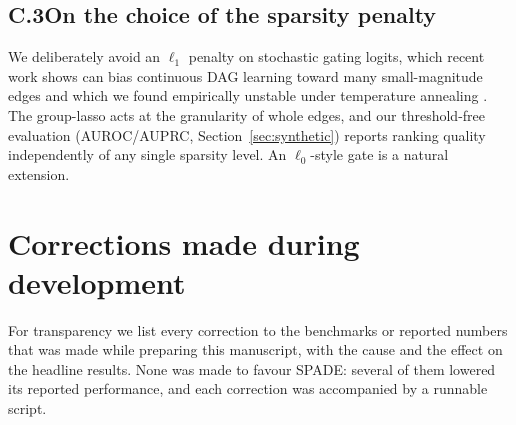 \subsection*{C.3\quad On the choice of the sparsity penalty}

We deliberately avoid an $\ell_1$ penalty on stochastic gating logits, which recent
work shows can bias continuous DAG learning toward many small-magnitude edges and
which we found empirically unstable under temperature annealing
\citep{ng2020golem,Bello2022}. The group-lasso acts at the granularity of whole
edges, and our threshold-free evaluation (AUROC/AUPRC, Section~\ref{sec:synthetic})
reports ranking quality independently of any single sparsity level. An
$\ell_0$-style gate is a natural extension.


\section{Corrections made during development}
\label{app:corrections}

For transparency we list every correction to the benchmarks or reported numbers
that was made while preparing this manuscript, with the cause and the effect on
the headline results. None was made to favour SPADE: several of them lowered its
reported performance, and each correction was accompanied by a runnable script.

